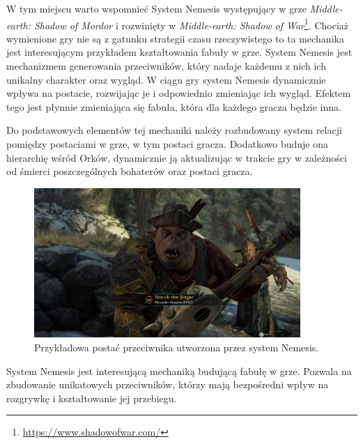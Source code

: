 W tym miejscu warto wspomnieć System Nemesis występujący w grze \textit{Middle-earth: Shadow of Mordor} i rozwinięty w
\textit{Middle-earth: Shadow of War}\footnote{\url{https://www.shadowofwar.com/}}. Chociaż wymienione gry nie są z gatunku strategii czasu rzeczywistego to ta mechanika jest
interesującym przykładem kształtowania fabuły w grze. System Nemesis jest mechanizmem generowania przeciwników, który nadaje
każdemu z nich ich unikalny charakter oraz wygląd. W ciągu gry system Nemesis dynamicznie wpływa na postacie, rozwijając
je i odpowiednio zmieniając ich wygląd. Efektem tego jest płynnie zmieniająca się fabuła, która dla każdego gracza
będzie inna.

Do podstawowych elementów tej mechaniki należy rozbudowany system relacji pomiędzy postaciami w grze, w tym postaci
gracza. Dodatkowo buduje ona hierarchię wśród Orków, dynamicznie ją aktualizując w trakcie gry w zależności od śmierci
poszczególnych bohaterów oraz postaci gracza.

\begin{figure}[h!]
    \centering
    \includegraphics[width=0.9\textwidth]{images/system_nemesis.jpg}
    \caption{Przykładowa postać przeciwnika utworzona przez system Nemesis.}
\end{figure}

System Nemesis jest interesującą mechaniką budującą fabułę w grze. Pozwala na zbudowanie unikatowych przeciwników,
którzy mają bezpośredni wpływ na rozgrywkę i kształtowanie jej przebiegu.
